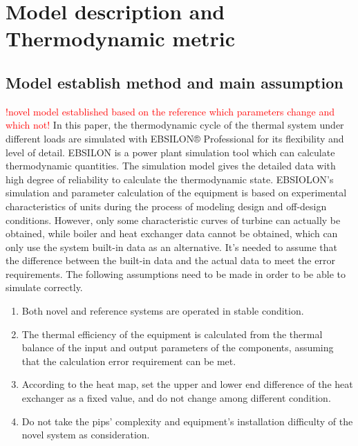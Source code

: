\documentclass[preprint,12pt]{elsarticle}
\begin{document}
\section{Model description and Thermodynamic metric}
\label{ssub:model_establishment_and_system_analysis_method}

\subsection{Model establish method and main assumption}
\label{ssub3:modle description}
\textcolor{red}{!novel model established based on the reference which parameters change and which not! }
In this paper, the thermodynamic cycle of the thermal system under different loads are simulated with EBSILON® Professional for its flexibility and level of detail. 
EBSILON is a power plant simulation tool which can calculate thermodynamic quantities. 
The simulation model gives the detailed data with high degree of reliability to calculate the thermodynamic state.
EBSIOLON's simulation and parameter calculation of the equipment is based on experimental characteristics of units during the process of modeling design and off-design conditions.
However, only some characteristic curves of turbine can actually be obtained, while boiler and heat exchanger data cannot be obtained, which can only use the system built-in data as an alternative.
It’s needed to assume that the difference between the built-in data and the actual data to meet the error requirements.
The following assumptions need to be made in order to be able to simulate correctly.
\begin{enumerate}[(1)]
\item Both novel and reference systems are operated in stable condition.
\item The thermal efficiency of the equipment is calculated from the thermal balance of the input and output parameters of the components, assuming that the calculation error requirement can be met.
\item According to the heat map, set the upper and lower end difference of the heat exchanger as a fixed value, and do not change among different condition.
\item  Do not take the pips' complexity and equipment’s installation difficulty of the novel system as consideration.
\end{enumerate}
\end{document}
